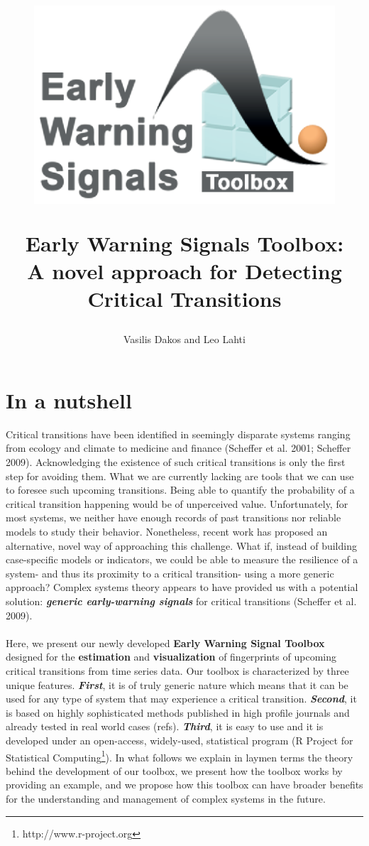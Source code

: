 \documentclass[12pt,a4paper,final]{article}
\author{Vasilis Dakos and Leo Lahti}
\title{
\begin{figure}[h]
\includegraphics[scale=0.55]{logoEWS.eps}
\end{figure}
Early Warning Signals Toolbox:\\ 
A novel approach for Detecting Critical Transitions
}
\begin{document}
\maketitle

\section{In a nutshell} %

Critical transitions have been identified in seemingly disparate systems ranging from ecology and climate to medicine and finance (Scheffer et al. 2001; Scheffer 2009). %
Acknowledging the existence of such critical transitions is only the first step for avoiding them. What we are currently lacking are tools that we can use to foresee such upcoming transitions. Being able to quantify the probability of a critical transition happening would be of unperceived value. Unfortunately, for most systems, we neither have enough records of past transitions nor reliable models to study their behavior. Nonetheless, recent work has proposed an alternative, novel way of approaching this challenge. What if, instead of building case-specific models or indicators, we could be able to measure the resilience of a system- and thus its proximity to a critical transition- using a more generic approach? Complex systems theory appears to have provided us with a potential solution: \textit{\textbf{generic early-warning signals}} for critical transitions (Scheffer et al. 2009). 
\\
\\
Here, we present our newly developed \textbf{Early Warning Signal Toolbox} designed for the \textbf{estimation} and \textbf{visualization} of fingerprints of upcoming critical transitions from time series data. Our toolbox is characterized by three unique features. \textit{\textbf{First}}, it is of truly generic nature which means that it can be used for any type of system that may experience a critical transition. \textit{\textbf{Second}}, it is based on highly sophisticated methods published in high profile journals and already tested in real world cases (refs). \textit{\textbf{Third}}, it is easy to use and it is developed under an open-access, widely-used, statistical program (R Project for Statistical Computing\footnote{http://www.r-project.org}). In what follows we explain in laymen terms the theory behind the development of our toolbox, we present how the toolbox works by providing an example, and we propose how this toolbox can have broader benefits for the understanding and management of complex systems in the future.  
\end{document}
